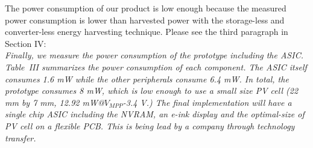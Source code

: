 \documentclass[onecolumn]{IEEEconf}
\begin{document}
\begin{description}
The power consumption of our product is low enough because the measured power consumption is lower than harvested power with the storage-less and converter-less energy harvesting technique. Please see the third paragraph in Section IV:\\

\textit{Finally, we measure the power consumption of the prototype including the ASIC. Table~III summarizes the power consumption of each component. The ASIC itself consumes 1.6 mW while the other peripherals consume 6.4 mW. In total, the prototype consumes 8 mW, which is low enough to use a small size PV cell (22 mm by 7 mm, 12.92 mW@$V_{MPP}$-3.4 V.) The final implementation will have a single chip ASIC including the NVRAM, an e-ink display and the optimal-size of PV cell on a flexible PCB. This is being lead by a company through technology transfer.}

\end{description}
\end{document}
